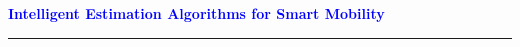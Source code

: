 \documentclass[a4paper,11pt]{article}
\begin{document}
\thispagestyle{plain}










\renewcommand\refname{}

%
%
%
%
%



\vspace*{-1.8cm}
\begin{center}
 \LARGE
\textcolor{blue}{\bf Intelligent Estimation Algorithms for Smart Mobility}
\end{center}
\hrule
\normalsize
% 
\end{document}
